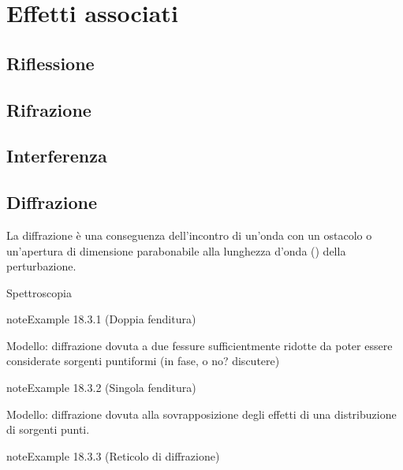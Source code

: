 \documentclass[letterpaper,10pt,italian]{jupyterBook}
\begin{document}
\section{Effetti associati}
\label{\detokenize{ch/waves/intro:effetti-associati}}\label{\detokenize{ch/waves/intro:physics-hs-waves-effects}}

\subsection{Riflessione}
\label{\detokenize{ch/waves/intro:riflessione}}\label{\detokenize{ch/waves/intro:physics-hs-waves-effects-reflection}}

\subsection{Rifrazione}
\label{\detokenize{ch/waves/intro:rifrazione}}\label{\detokenize{ch/waves/intro:physics-hs-waves-effects-refraction}}

\subsection{Interferenza}
\label{\detokenize{ch/waves/intro:interferenza}}\label{\detokenize{ch/waves/intro:physics-hs-waves-effects-interference}}

\subsection{Diffrazione}
\label{\detokenize{ch/waves/intro:diffrazione}}\label{\detokenize{ch/waves/intro:physics-hs-waves-effects-diffraction}}
\sphinxAtStartPar
La diffrazione è una conseguenza dell’incontro di un’onda con un ostacolo o un’apertura di dimensione parabonabile alla lunghezza d’onda ({\hyperref[\detokenize{ch/waves/intro:wave-length}]{}}) della perturbazione.

\sphinxAtStartPar
{} Spettroscopia
\label{ch/waves/intro:example-3}
\begin{sphinxadmonition}{note}{Example 18.3.1 (Doppia fenditura)}



\sphinxAtStartPar
Modello: diffrazione dovuta a due fessure sufficientmente ridotte da poter essere considerate sorgenti puntiformi (in fase, o no? discutere)
\end{sphinxadmonition}
\label{ch/waves/intro:example-4}
\begin{sphinxadmonition}{note}{Example 18.3.2 (Singola fenditura)}



\sphinxAtStartPar
Modello: diffrazione dovuta alla sovrapposizione degli effetti di una distribuzione di sorgenti punti.
\end{sphinxadmonition}
\label{ch/waves/intro:example-5}
\begin{sphinxadmonition}{note}{Example 18.3.3 (Reticolo di diffrazione)}


\end{sphinxadmonition}
\end{document}
